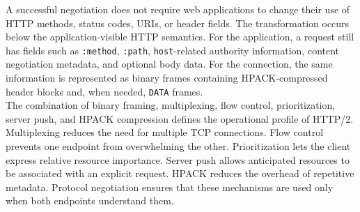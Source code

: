 \documentclass{scrbook}
\begin{document}
A successful negotiation does not require web applications to change their use of HTTP methods, status codes, URIs, or header fields. The transformation occurs below the application-visible HTTP semantics. For the application, a request still has fields such as \texttt{:method}, \texttt{:path}, \texttt{host}-related authority information, content negotiation metadata, and optional body data. For the connection, the same information is represented as binary frames containing HPACK-compressed header blocks and, when needed, \texttt{DATA} frames.\\

The combination of binary framing, multiplexing, flow control, prioritization, server push, and HPACK compression defines the operational profile of HTTP/2. Multiplexing reduces the need for multiple TCP connections. Flow control prevents one endpoint from overwhelming the other. Prioritization lets the client express relative resource importance. Server push allows anticipated resources to be associated with an explicit request. HPACK reduces the overhead of repetitive metadata. Protocol negotiation ensures that these mechanisms are used only when both endpoints understand them.
\end{document}
